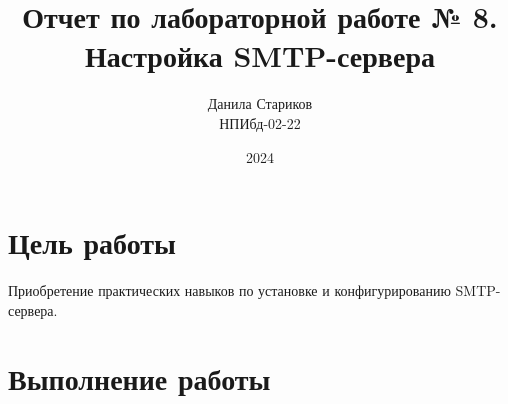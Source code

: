 

\title{Отчет по лабораторной работе № 8. \\ Настройка SMTP-сервера}
\author{Данила Стариков \\ НПИбд-02-22}
\date{2024}



\maketitle
\newpage

\tableofcontents

\newpage
\section{Цель работы}
Приобретение практических навыков по установке и конфигурированию SMTP-сервера.

\newpage
\section{Выполнение работы}

